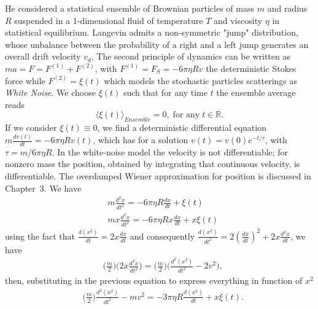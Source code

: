 He considered a statistical ensemble of Brownian particles of mass $m$ and radius $R$ suspended in a 1-dimensional fluid of temperature $T$ and viscosity $\eta$ in statistical equilibrium.
Langevin admits a non-symmetric "jump" distribution, whose unbalance between the probability of a right and a left jump generates an overall drift velocity $v_d$.
The second principle of dynamics can be written as $ma=F=F^{(1)}+F^{(2)}$, with $F^{(1)}=F_S=-6\pi\eta Rv$ the deterministic Stokes force while $F^{(2)}=\xi(t)$ which models the stochastic particles scatterings as \textit{White Noise}.
We choose $\xi(t)$ such that for any time $t$ the ensemble average reads
\begin{equation}
	\langle \xi(t)\rangle_{Ensemble}=0, \;\mathrm{for}\,\,\mathrm{any}\; t\in \mathbb{R}.
\end{equation}
If we consider $\xi(t)\equiv 0$, we find a deterministic differential equation $m\frac{dv(t)}{dt}=-6\pi\eta R v(t)$, which has for a solution $v(t)=v(0)e^{-t/\tau}$, with $\tau=m/6\pi\eta R$.
In the white-noise model the velocity is not differentiable; for nonzero mass the position, obtained by integrating that continuous velocity, is differentiable.
The overdamped Wiener approximation for position is discussed in Chapter~3.
We have
\begin{equation}\begin{split}
	&m\frac{d^2x}{dt^2}=-6\pi\eta R\frac{dx}{dt}+\xi(t)\\
	& mx\frac{d^2x}{dt^2}=-6\pi\eta Rx\frac{dx}{dt}+x\xi(t)
\end{split}\end{equation}
using the fact that $\frac{d(x^2)}{dt}=2x\frac{dx}{dt}$ and consequently $\frac{d(x^2)}{dt^2}=2(\frac{dx}{dt})^2+2x\frac{d^2x}{dt}$, we have
\begin{equation}\begin{split}
	&\bigg(\frac{m}{2}\bigg)\bigg(2x\frac{d^2x}{dt^2}\bigg)=\bigg(\frac{m}{2}\bigg)\bigg(\frac{d^2(x^2)}{dt^2}-2v^2\bigg),
\end{split}\end{equation}
then, substituting in the previous equation to express everything in function of $x^2$
\begin{equation}\begin{split}
	&\bigg(\frac{m}{2}\bigg)\frac{d^2(x^2)}{dt^2}-mv^2=-3\pi\eta R\frac{d(x^2)}{dt}+x\xi(t).
\end{split}\end{equation}
